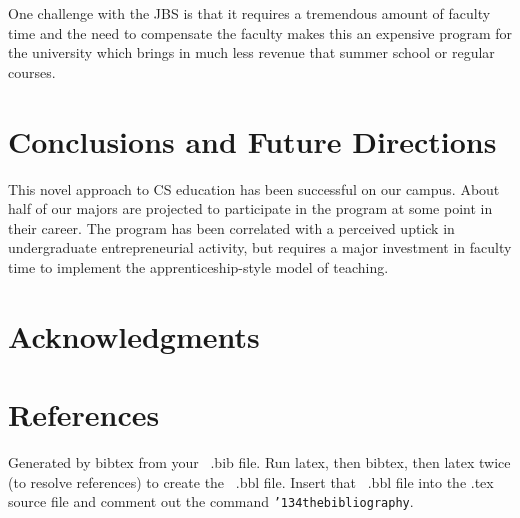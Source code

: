 \documentclass{sig-alternate}
\begin{document}
One challenge with the JBS is that it requires a tremendous amount of faculty time and the need to compensate the faculty makes this an expensive program for the university which brings in much less revenue that summer school or regular courses.

\section{Conclusions and Future Directions}

This novel approach to CS education has been successful on our campus. About half of our majors are projected to participate in the program at some point in their career. The program has been correlated with a perceived uptick in undergraduate entrepreneurial activity, but requires a major investment in faculty time to implement the apprenticeship-style model of teaching.


\section*{Acknowledgments}
%

%
%

\section*{References}
Generated by bibtex from your ~.bib file.  Run latex,
then bibtex, then latex twice (to resolve references)
to create the ~.bbl file.  Insert that ~.bbl file into
the .tex source file and comment out
the command \texttt{{\char'134}thebibliography}.

\end{document}
